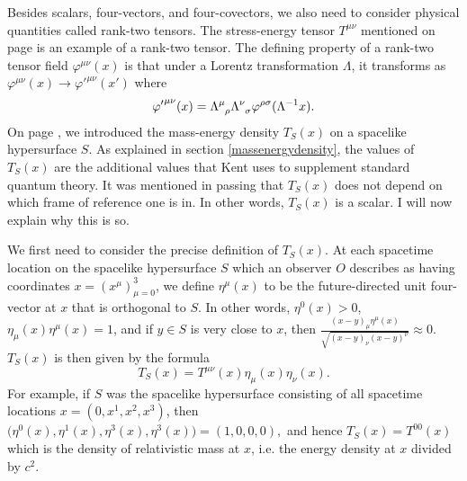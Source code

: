 Besides scalars, four-vectors, and four-covectors, we also need to consider physical quantities called rank-two tensors. The stress-energy tensor $T^{\mu\nu}$ mentioned on page \pageref{stressenergy} is an example of a rank-two tensor. The defining property of a rank-two tensor field $\varphi^{\mu\nu}(x)$ is that under a Lorentz transformation $\Lambda$, it transforms as $\varphi^{\mu\nu}(x)\rightarrow{\varphi'}^{\mu\nu}(x')$ where
\begin{equation}\label{lorentztensor}
{\varphi'}^{\mu\nu}(x)=\Lambda\indices{^\mu_\rho}\Lambda\indices{^\nu_\sigma}\varphi^{\rho\sigma}(\Lambda^{-1}x).
\end{equation}
On page \pageref{massenergydensity}, we introduced the mass-energy density $T_S(x)$ on a spacelike hypersurface $S$. As explained in section \ref{massenergydensity}, the values of $T_S(x)$ are the additional values that Kent uses to supplement standard quantum theory.  It was mentioned in passing that $T_S(x)$ does not depend on which frame of reference one is in. In other words, $T_S(x)$ is a scalar. I will now explain why this is so. 

We first need to consider the precise definition of $T_S(x)$. At each spacetime location on the spacelike hypersurface $S$ which an observer $O$ describes as having coordinates $x=(x^\mu)_{\mu=0}^3$, we define  $\eta^\mu(x)$ to be the future-directed  unit four-vector at $x$ that is orthogonal to $S$. In other words, $\eta^0(x)>0$, $\eta_\mu(x)\eta^\mu(x)=1$, and if $y\in S$ is very close to $x$, then $\frac{(x-y)_\mu\eta^\mu(x)}{\sqrt{(x-y)_\nu(x-y)^\nu}}\approx 0.$  $T_S(x)$ is then given by the formula 
\begin{equation}\label{TSdef}
T_S(x)=T^{\mu\nu}(x)\eta_{\mu}(x)\eta_{\nu}(x).
\end{equation}
For example, if $S$ was the spacelike hypersurface consisting of all spacetime locations $x = (0,x^1,x^2,x^3)$, then $\big(\eta^{0}(x),\eta^{1}(x),\eta^{3}(x),\eta^{3}(x)\big) =(1,0,0,0),$ and hence $T_S(x)=T^{00}(x)$ which is the density of relativistic mass at $x$, i.e. the energy density at $x$ divided by $c^2$. 

